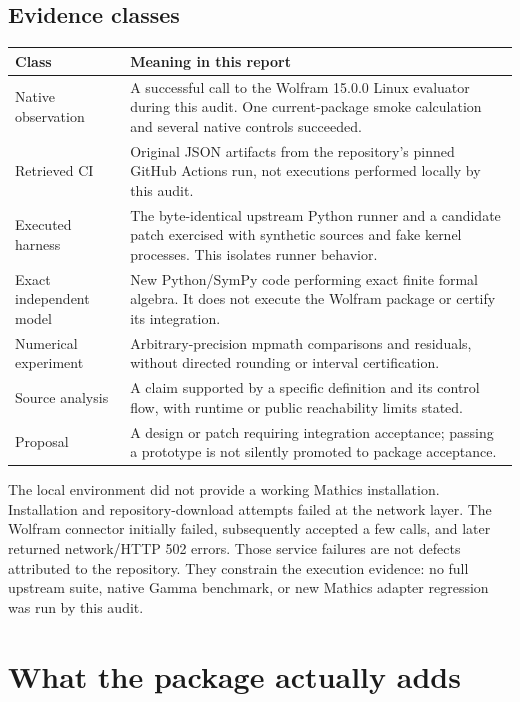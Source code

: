 \documentclass[11pt,letterpaper]{article}
\newcommand{\code}[1]{\texttt{\detokenize{#1}}}
\begin{document}
\subsection{Evidence classes}
\begin{longtable}{@{}P{0.18\textwidth}P{0.75\textwidth}@{}}
\toprule
Class & Meaning in this report\\\midrule\endhead
Native observation & A successful call to the Wolfram 15.0.0 Linux evaluator during this audit. One current-package smoke calculation and several native \code{Limit} controls succeeded.\\
Retrieved CI & Original JSON artifacts from the repository's pinned GitHub Actions run, not executions performed locally by this audit.\\
Executed harness & The byte-identical upstream Python runner and a candidate patch exercised with synthetic sources and fake kernel processes. This isolates runner behavior.\\
Exact independent model & New Python/SymPy code performing exact finite formal algebra. It does not execute the Wolfram package or certify its integration.\\
Numerical experiment & Arbitrary-precision mpmath comparisons and residuals, without directed rounding or interval certification.\\
Source analysis & A claim supported by a specific definition and its control flow, with runtime or public reachability limits stated.\\
Proposal & A design or patch requiring integration acceptance; passing a prototype is not silently promoted to package acceptance.\\\bottomrule
\end{longtable}

The local environment did not provide a working Mathics installation. Installation and repository-download attempts failed at the network layer. The Wolfram connector initially failed, subsequently accepted a few calls, and later returned network/HTTP 502 errors. Those service failures are not defects attributed to the repository. They constrain the execution evidence: no full upstream suite, native Gamma benchmark, or new Mathics adapter regression was run by this audit.

\section{What the package actually adds}
\end{document}
